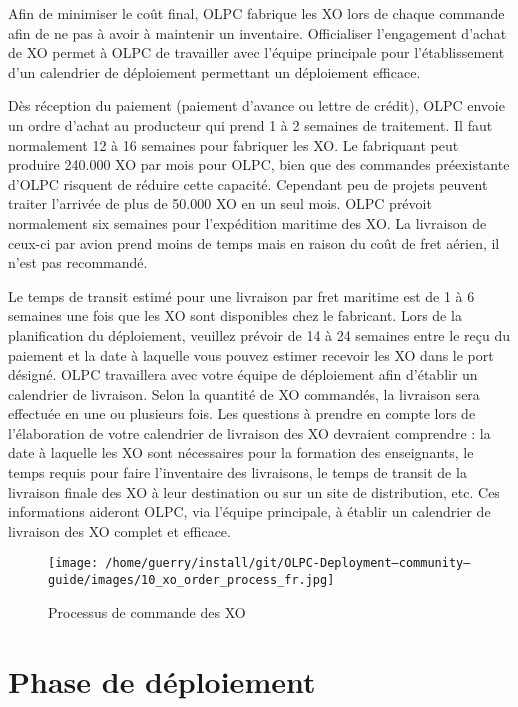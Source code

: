 \documentclass[11pt]{article}
\begin{document}

Afin de minimiser le coût final, OLPC fabrique les XO lors de chaque
commande afin de ne pas à avoir à maintenir un inventaire. Officialiser
l'engagement d'achat de XO permet à OLPC de travailler avec l'équipe
principale pour l'établissement d'un calendrier de déploiement permettant
un déploiement efficace.

Dès réception du paiement (paiement d'avance ou lettre de crédit), OLPC
envoie un ordre d'achat au producteur qui prend 1 à 2 semaines de
traitement. Il faut normalement 12 à 16 semaines pour fabriquer les XO. Le
fabriquant peut produire 240.000 XO par mois pour OLPC, bien que des
commandes préexistante d'OLPC risquent de réduire cette capacité. Cependant
peu de projets peuvent traiter l'arrivée de plus de 50.000 XO en un seul
mois. OLPC prévoit normalement six semaines pour l'expédition maritime des
XO. La livraison de ceux-ci par avion prend moins de temps mais en raison
du coût de fret aérien, il n'est pas recommandé.

Le temps de transit estimé pour une livraison par fret maritime est de 1 à
6 semaines une fois que les XO sont disponibles chez le fabricant. Lors de
la planification du déploiement, veuillez prévoir de 14 à 24 semaines entre
le reçu du paiement et la date à laquelle vous pouvez estimer recevoir les
XO dans le port désigné. OLPC travaillera avec votre équipe de déploiement
afin d'établir un calendrier de livraison. Selon la quantité de XO
commandés, la livraison sera effectuée en une ou plusieurs fois. Les
questions à prendre en compte lors de l'élaboration de votre calendrier de
livraison des XO devraient comprendre : la date à laquelle les XO sont
nécessaires pour la formation des enseignants, le temps requis pour faire
l'inventaire des livraisons, le temps de transit de la livraison finale des
XO à leur destination ou sur un site de distribution, etc. Ces informations
aideront OLPC, via l'équipe principale, à établir un calendrier de
livraison des XO complet et efficace.

\begin{figure}[htb]
\centering
\texttt{[image: /home/guerry/install/git/OLPC-Deployment--community--guide/images/10\_xo\_order\_process\_fr.jpg]}
\caption{Processus de commande des XO}
\end{figure}
\section{Phase de déploiement}
\label{sec-9}
\end{document}
